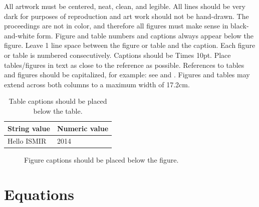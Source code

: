 \documentclass{article}
\begin{document}
All artwork must be centered, neat, clean, and legible.
All lines should be very dark for purposes of reproduction and art work should not be hand-drawn.
The proceedings are not in color, and therefore all figures must make sense in black-and-white form.
Figure and table numbers and captions always appear below the figure.
Leave 1 line space between the figure or table and the caption.
Each figure or table is numbered consecutively. Captions should be Times 10pt.
Place tables/figures in text as close to the reference as possible.
References to tables and figures should be capitalized, for example:
see  and .
Figures and tables may extend across both columns to a maximum width of 17.2cm.

\begin{table}
 \begin{center}
 \begin{tabular}{|l|l|}
  \hline
  String value & Numeric value \\
  \hline
  Hello ISMIR  & 2014 \\
  \hline
 \end{tabular}
\end{center}
 \caption{Table captions should be placed below the table.}
 \label{tab:example}
\end{table}

\begin{figure}
 \centerline{}
 \caption{Figure captions should be placed below the figure.}
 \label{fig:example}
\end{figure}

\section{Equations}
\end{document}
